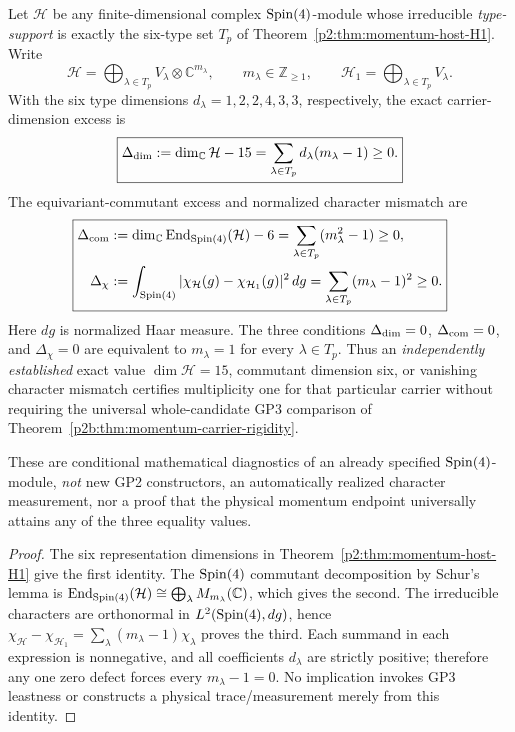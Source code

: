 \documentclass[12pt,a4paper]{article}
\begin{document}
\begin{corollary}
\label{p2b:cor:v279-six-type-multiplicity-detectors}
Let \(\mathcal H\) be any finite-dimensional complex \(\mathrm{Spin}(4)\)-module whose
irreducible \emph{type-support} is exactly the six-type set \(T_p\) of
Theorem~\ref{p2:thm:momentum-host-H1}.  Write
\[
 \mathcal H=\bigoplus_{\lambda\in T_p}V_\lambda\otimes\mathbb C^{m_\lambda},
 \qquad m_\lambda\in\mathbb Z_{\ge1},\qquad
 \mathcal H_1=\bigoplus_{\lambda\in T_p}V_\lambda.
\]
With the six type dimensions \(d_\lambda=1,2,2,4,3,3\), respectively,
the exact carrier-dimension excess is
\[
 \boxed{\Delta_{\rm dim}:=\dim_{\mathbb C}\mathcal H-15
   =\sum_{\lambda\in T_p}d_\lambda(m_\lambda-1)\ge0.}
\]
The equivariant-commutant excess and normalized character mismatch are
\[
 \boxed{\begin{aligned}
 \Delta_{\rm com}&:=\dim_{\mathbb C}\operatorname{End}_{\mathrm{Spin}(4)}(\mathcal H)-6
                   =\sum_{\lambda\in T_p}(m_\lambda^2-1)\ge0,\\
 \Delta_{\chi}&:=\int_{\mathrm{Spin}(4)}
                |\chi_{\mathcal H}(g)-\chi_{\mathcal H_1}(g)|^2\,dg
                   =\sum_{\lambda\in T_p}(m_\lambda-1)^2\ge0.
 \end{aligned}}
\]
Here \(dg\) is normalized Haar measure.  The three conditions
\(\Delta_{\rm dim}=0\), \(\Delta_{\rm com}=0\), and
\(\Delta_\chi=0\) are equivalent to \(m_\lambda=1\) for every
\(\lambda\in T_p\).  Thus an \emph{independently established} exact value
\(\dim\mathcal H=15\), commutant dimension six, or vanishing character
mismatch certifies multiplicity one for that particular carrier without
requiring the universal whole-candidate GP3 comparison of
Theorem~\ref{p2b:thm:momentum-carrier-rigidity}.

These are conditional mathematical diagnostics of an already specified
\(\mathrm{Spin}(4)\)-module, \emph{not} new GP2 constructors, an automatically
realized character measurement, nor a proof that the physical momentum
endpoint universally attains any of the three equality values.
\end{corollary}
\begin{proof}
The six representation dimensions in Theorem~\ref{p2:thm:momentum-host-H1} give the first identity.  The
\(\mathrm{Spin}(4)\) commutant decomposition by Schur's lemma is
\(\operatorname{End}_{\mathrm{Spin}(4)}(\mathcal H)\cong\bigoplus_\lambda M_{m_\lambda}(\mathbb C)\),
which gives the second.  The irreducible characters are orthonormal in
\(L^2(\mathrm{Spin}(4),dg)\), hence
\(\chi_{\mathcal H}-\chi_{\mathcal H_1}
 =\sum_\lambda(m_\lambda-1)\chi_\lambda\) proves the third.
Each summand in each expression is nonnegative, and all coefficients
\(d_\lambda\) are strictly positive; therefore any one zero defect
forces every \(m_\lambda-1=0\).  No implication invokes GP3 leastness or
constructs a physical trace/measurement merely from this identity.
\end{proof}
\end{document}
